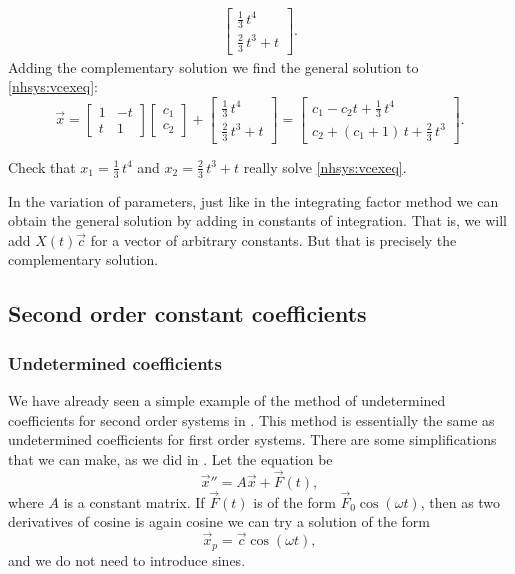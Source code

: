 \begin{example}
\begin{equation*}
\begin{split}
\begin{bmatrix}
\frac{1}{3}\,t^4 \\
\frac{2}{3}\,t^3 + t
\end{bmatrix}  .
\end{split}
\end{equation*}
Adding the complementary solution we find the general solution
to \eqref{nhsys:vcexeq}:
\begin{equation*}
\vec{x} =
\begin{bmatrix}
1 & -t \\
t & 1
\end{bmatrix}
\begin{bmatrix}
c_1 \\ c_2
\end{bmatrix}
+
\begin{bmatrix}
\frac{1}{3}\,t^4 \\
\frac{2}{3}\,t^3 + t
\end{bmatrix}
=
\begin{bmatrix}
c_1 - c_2 t
+
\frac{1}{3}\,t^4 \\
c_2 + 
(c_1 + 1)\, t
+
\frac{2}{3}\,t^3
\end{bmatrix} .
\end{equation*}
\end{example}

\begin{exercise}
Check that $x_1 = 
\frac{1}{3}\,t^4$ and $x_2 = 
\frac{2}{3}\,t^3 + t$ really solve
\eqref{nhsys:vcexeq}.
\end{exercise}

In the variation of parameters, just like in the integrating factor method
we can obtain the general solution by adding in constants of integration.
That is, we will add $X(t) \vec{c}$ for a vector of arbitrary constants.  But
that is precisely the complementary solution.

\subsection{Second order constant coefficients}

\subsubsection{Undetermined coefficients}

We have already seen a simple example of the method
of undetermined coefficients
for second order systems in .
This method is essentially the same as undetermined coefficients for first
order systems.
There are some simplifications that we can make, as we did in 
.  Let the equation be
\begin{equation*}
{\vec{x}}'' = A \vec{x} + \vec{F}(t) ,
\end{equation*}
where $A$ is a constant matrix.  If $\vec{F}(t)$ is of the form
$\vec{F}_0 \cos (\omega t)$, then as two derivatives of cosine is again
cosine we can try a solution of the form
\begin{equation*}
\vec{x}_p = \vec{c} \cos (\omega t) ,
\end{equation*}
and we do not need to introduce sines.

